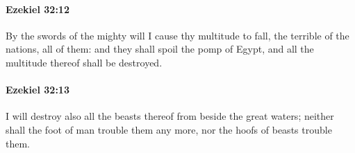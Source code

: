 		\paragraph{Ezekiel 32:12} %
			\label{EZEKIEL-32-12}

			By the swords of the mighty will I cause thy multitude to fall, the terrible of the nations, all of them: and they shall spoil the pomp of Egypt, and all the multitude thereof shall be destroyed.


		\paragraph{Ezekiel 32:13} %
			\label{EZEKIEL-32-13}

			I will destroy also all the beasts thereof from beside the great waters; neither shall the foot of man trouble them any more, nor the hoofs of beasts trouble them.


